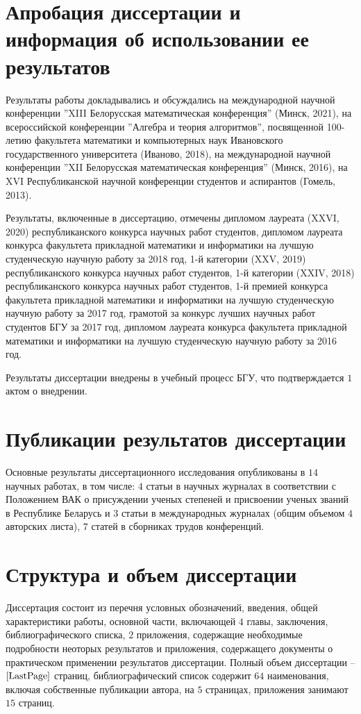 \documentclass[_00_dissertation.tex]{subfiles}
\begin{document}
\section*{Апробация диссертации и информация об использовании ее результатов}

Результаты работы докладывались и обсуждались на международной научной конференции ''XIII Белорусская математическая конференция'' (Минск, 2021), на всероссийской конференции ''Алгебра и теория алгоритмов'', посвященной 100-летию факультета математики и компьютерных наук Ивановского государственного университета (Иваново, 2018), на международной научной конференции ''XII Белорусская математическая конференция'' (Минск, 2016), на XVI Республиканской научной конференции студентов и аспирантов (Гомель, 2013).

Результаты, включенные в диссертацию, отмечены дипломом лауреата (XXVI, 2020) республиканского конкурса научных работ студентов, дипломом лауреата конкурса факультета прикладной математики и информатики на лучшую студенческую научную работу за 2018 год, 1-й категории (XXV, 2019) республиканского конкурса научных работ студентов, 1-й категории (XXIV, 2018) республиканского конкурса научных работ студентов, 1-й премией конкурса факультета прикладной математики и информатики на лучшую студенческую научную работу за 2017 год, грамотой за конкурс лучших научных работ студентов БГУ за 2017 год, дипломом лауреата конкурса факультета прикладной математики и информатики на лучшую студенческую научную работу за 2016 год.

Результаты диссертации внедрены в учебный процесс БГУ, что подтверждается $1$ актом о внедрении.

\section*{Публикации результатов диссертации}

Основные результаты диссертационного исследования опубликованы в $14$ научных работах, в том числе: $4$ статьи в научных журналах в соответствии с Положением ВАК о присуждении ученых степеней и присвоении ученых званий в Республике Беларусь и $3$ статьи в международных журналах (общим объемом $4$ авторских листа), $7$ статей в сборниках трудов конференций.

\section*{Структура и объем диссертации}

Диссертация состоит из перечня условных обозначений, введения, общей характеристики работы, основной части, включающей $4$ главы, заключения, библиографического списка, $2$ приложения, содержащие необходимые подробности неоторых результатов и приложения, содержащего документы о практическом применении результатов диссертации.
Полный объем диссертации -- $\pageref{LastPage}$ страниц, библиографический список содержит $64$ наименования, включая собственные публикации автора, на $5$ страницах, приложения занимают $15$ страниц.

\onlyinsubfile{
    
}
\end{document}
